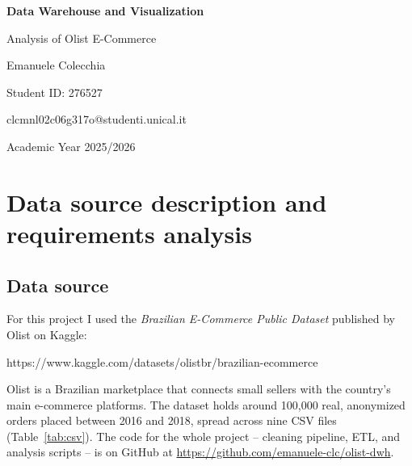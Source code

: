 \documentclass[12pt,a4paper]{article}
\begin{document}
\thispagestyle{empty}

\begin{titlepage}
  \centering
  \vspace*{4cm}
  {\LARGE\textbf{Data Warehouse and Visualization}\par}
  \vspace{0.8cm}
  {\large Analysis of Olist E-Commerce\par}
  \vspace{1.5cm}
  {\large Emanuele Colecchia\par}
  {\large Student ID: 276527\par}
  \vspace{0.5cm}
  {\ttfamily clcmnl02c06g317o@studenti.unical.it\par}
  \vspace{0.5cm}
  {\large Academic Year 2025/2026\par}
\end{titlepage}

\tableofcontents
\clearpage

\section{Data source description and requirements analysis}

\subsection{Data source}

For this project I used the \textit{Brazilian E-Commerce Public Dataset} published by
Olist on Kaggle:

\begin{center}
  \ttfamily https://www.kaggle.com/datasets/olistbr/brazilian-ecommerce
\end{center}

Olist is a Brazilian marketplace that connects small sellers with the country's main
e-commerce platforms. The dataset holds around 100,000 real, anonymized orders placed
between 2016 and 2018, spread across nine CSV files (Table~\ref{tab:csv}). The code for
the whole project -- cleaning pipeline, ETL, and analysis scripts -- is on GitHub at
\url{https://github.com/emanuele-clc/olist-dwh}.
\end{document}

